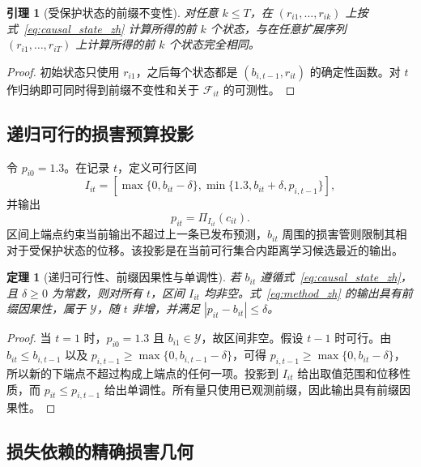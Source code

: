 \documentclass[UTF8,11pt]{ctexart}
\newtheorem{lemma}{引理}
\newtheorem{theorem}{定理}
\begin{document}
\begin{lemma}[受保护状态的前缀不变性]
\label{lem:prefix_zh}
对任意 $k\leq T$，在 $(r_{i1},\ldots,r_{ik})$ 上按式~\eqref{eq:causal_state_zh} 计算所得的前 $k$ 个状态，与在任意扩展序列 $(r_{i1},\ldots,r_{iT})$ 上计算所得的前 $k$ 个状态完全相同。
\end{lemma}
\begin{proof}
初始状态只使用 $r_{i1}$，之后每个状态都是 $(b_{i,t-1},r_{it})$ 的确定性函数。对 $t$ 作归纳即可同时得到前缀不变性和关于 $\mathcal F_{it}$ 的可测性。
\end{proof}

\subsection{递归可行的损害预算投影}

令 $p_{i0}=1.3$。在记录 $t$，定义可行区间
\begin{equation}
  I_{it}=\left[
  \max\{0,b_{it}-\delta\},
  \min\{1.3,b_{it}+\delta,p_{i,t-1}\}
  \right],
  \label{eq:feasible_interval_zh}
\end{equation}
并输出
\begin{equation}
  p_{it}=\Pi_{I_{it}}(c_{it}).
  \label{eq:method_zh}
\end{equation}
区间上端点约束当前输出不超过上一条已发布预测，$b_{it}$ 周围的损害管则限制其相对于受保护状态的位移。该投影是在当前可行集合内距离学习候选最近的输出。

\begin{theorem}[递归可行性、前缀因果性与单调性]
\label{thm:pchp_zh}
若 $b_{it}$ 遵循式~\eqref{eq:causal_state_zh}，且 $\delta\geq0$ 为常数，则对所有 $t$，区间 $I_{it}$ 均非空。式~\eqref{eq:method_zh} 的输出具有前缀因果性，属于 $\mathcal Y$，随 $t$ 非增，并满足 $|p_{it}-b_{it}|\leq\delta$。
\end{theorem}
\begin{proof}
当 $t=1$ 时，$p_{i0}=1.3$ 且 $b_{i1}\in\mathcal Y$，故区间非空。假设 $t-1$ 时可行。由 $b_{it}\leq b_{i,t-1}$ 以及 $p_{i,t-1}\geq\max\{0,b_{i,t-1}-\delta\}$，可得 $p_{i,t-1}\geq\max\{0,b_{it}-\delta\}$，所以新的下端点不超过构成上端点的任何一项。投影到 $I_{it}$ 给出取值范围和位移性质，而 $p_{it}\leq p_{i,t-1}$ 给出单调性。所有量只使用已观测前缀，因此输出具有前缀因果性。
\end{proof}

\subsection{损失依赖的精确损害几何}
\end{document}
